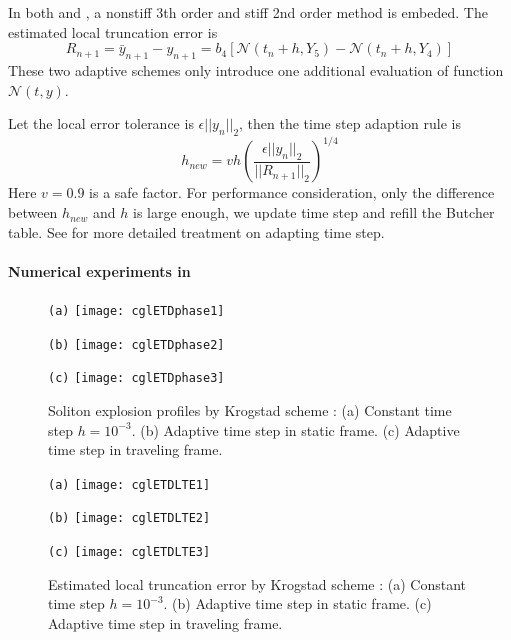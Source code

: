 In both  and ,
a nonstiff 3th order and stiff 2nd order method is
embeded. The estimated local truncation error is
\begin{equation}
  \label{eq:LTE}
  R_{n+1} = \bar{y}_{n+1} - y_{n+1} = b_4\left[\mathcal{N}(t_n+h, Y_5)-
    \mathcal{N}(t_n+h, Y_4)\right]
\end{equation}
These two adaptive schemes only introduce one additional evaluation of function
$\mathcal{N}(t, y)$.

Let the local error tolerance is $\epsilon ||y_{n}||_2$, then the time step
adaption rule is
\[
  h_{new} = vh\left(\frac{\epsilon ||y_{n}||_2}{||R_{n+1}||_2} \right)^{1/4}
\]
Here $v=0.9$ is a safe factor. For performance consideration, only the difference
between $h_{new}$ and $h$ is large enough, we update time step and refill the
Butcher table. See for more detailed treatment on adapting time
step.

\paragraph{Numerical experiments in \cqcGLe}

\begin{figure}[h]
  \centering
  \begin{minipage}{.25\textwidth}
    \centering \small{\texttt{(a)}}
    \texttt{[image: cglETDphase1]}
  \end{minipage}
  \begin{minipage}{.25\textwidth}
    \centering \small{\texttt{(b)}}
    \texttt{[image: cglETDphase2]}
  \end{minipage}%
  \begin{minipage}{.25\textwidth}
    \centering \small{\texttt{(c)}}
    \texttt{[image: cglETDphase3]}
  \end{minipage}
  \caption{ Soliton explosion profiles by Krogstad scheme :
    (a) Constant time step  $h=10^{-3}$.
    (b) Adaptive time step in static frame.
    (c) Adaptive time step in traveling frame.
  }
  \label{fig:cglETDphase}
\end{figure}

\begin{figure}[h]
  \centering
  \begin{minipage}{.32\textwidth}
    \centering \small{\texttt{(a)}}
    \texttt{[image: cglETDLTE1]}
  \end{minipage}
  \begin{minipage}{.32\textwidth}
    \centering \small{\texttt{(b)}}
    \texttt{[image: cglETDLTE2]}
  \end{minipage}%
  \begin{minipage}{.32\textwidth}
    \centering \small{\texttt{(c)}}
    \texttt{[image: cglETDLTE3]}
  \end{minipage}
  \caption{ Estimated local truncation error by Krogstad scheme :
    (a) Constant time step $h=10^{-3}$.
    (b) Adaptive time step in static frame.
    (c) Adaptive time step in traveling frame.
  }
  \label{fig:cglETDLTE}
\end{figure}

